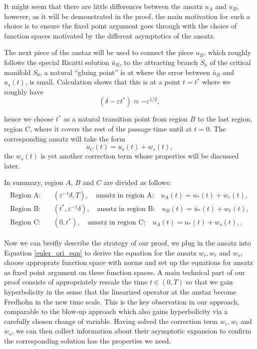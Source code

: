 \documentclass[letterpaper,11pt]{article}
\newcommand{\eps}{\varepsilon}
\numberwithin{equation}{section}
\theoremstyle{plain}
\begin{document}
It might seem that there are little differences between the ansatz $u_A$ and $u_B$, however, as it will be demonstrated in the proof, the main  motivation for such a choice is to ensure the fixed point argument goes through with the choice of function spaces motivated by the different asymptotics of the ansatz.

The next piece of the anstaz will be used to connect the piece $u_B$, which roughly follows the special Ricatti solution $\bar{u}_R$, to the attracting branch $S_a$ of the critical manifold $S_0$, a natural ``gluing point'' is at where the error between $\bar{u}_R$ and $u_s(t)$, is small. Calculation shows that this is at a point $t=t^*$ where we roughly have
\begin{equation}
(\delta - \eps t^*) \approx -\eps^{1/2},
\end{equation} 

hence we choose $t^*$ as a natural transition point from region $B$ to the last region, region $C$, where it covers the rest of the passage time until at $t=0$. The corresponding ansatz will take the form
\[
u_C(t) = u_s(t) + w_s(t),
\]
the $w_s(t)$ is yet another correction term whose properties will be discussed later. 

In summary, region $A$, $B$ and $C$ are divided as follows:
\begin{align}\label{region_division_t}
\begin{split}
\text{Region A:} & \quad (\eps^{-1}\delta, T), \quad \text{ansatz in region A:} \quad u_A(t) = u_*(t)+w_r(t), \\
\text{Region B:} & \quad (t^*, \eps^{-1}\delta), \quad \text{ansatz in region B:} \quad u_B(t) = \bar{u}_*(t)+w_\ell(t),  \\
\text{Region C:} & \quad (0, t^*), \quad \text{ansatz in region C:} \quad u_A(t) = u_*(t)+w_s(t), .
\end{split}
\end{align}

Now we can breifly describe the strategy of our proof, we plug in the ansatz into Equation \eqref{euler_ori_eqn} to derive the equation for the ansatz $w_r, w_\ell $ and $w_s$, choose approprate function space with norms and set up the equations for ansatz as fixed point argument on these function spaces. A main technical part of our proof consists of appropriately rescale the time $t \in (0,T)$ so that we gain hyperbolicity in the sense that the linearized operator at the anstaz become Fredholm in the new time scale. This is the key observation in our approach, comparable to the blow-up approach which also gains hyperbolicity via a carefully chosen change of variable. Having solved the correction term $w_r, w_\ell$ and $w_s$, we can then collect information about their asymptotic expansion to confirm the corresponding solution has the properties we need.
\end{document}
